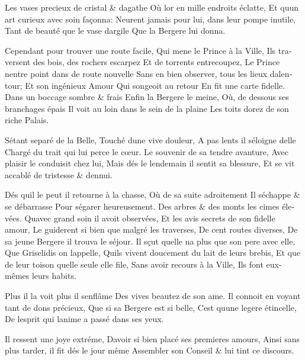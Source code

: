 \documentclass[14pt,a4paper]{memoir}
\begin{document}
\begin{otherlanguage}{french}
{Les vases precieux de cristal \& d\textquotesingle agathe} {Où
l\textquotesingle or en mille endroits éclatte,} {Et
qu\textquotesingle un art curieux avec soin façonna:}
{N\textquotesingle eurent jamais pour lui, dans leur pompe inutile,}
{Tant de beauté que le vase d\textquotesingle argile} {Que la Bergere
lui donna.}

{Cependant pour trouver une route facile,} {Qui mene le Prince à la
Ville,} {Ils traversent des bois, des rochers escarpez} {Et de torrents
entrecoupez,} {Le Prince n\textquotesingle entre point dans de route
nouvelle} {Sans en bien observer, tous les lieux
d\textquotesingle alentour; } {Et son ingénieux Amour} {Qui songeoit au
retour} {En fit une carte fidelle.} {Dans un boccage sombre \& frais}
{Enfin la Bergere le meine,} {Où, de dessous ses branchages épais} {Il
voit au loin dans le sein de la plaine} {Les toits dorez de son riche
Palais.}

{S\textquotesingle étant separé de la Belle,} {Touché
d\textquotesingle une vive douleur,} {A pas lents il
s\textquotesingle éloigne d\textquotesingle elle} {Chargé du trait qui
lui perce le cœur.} {Le souvenir de sa tendre avanture,} {Avec plaisir
le conduisit chez lui,} {Mais dés le lendemain il sentit sa blessure,}
{Et se vit accablé de tristesse \& d\textquotesingle ennui.}

{Dés qu\textquotesingle il le peut il retourne à la chasse,} {Où de sa
suite adroitement} {Il s\textquotesingle échappe \& se débarrasse} {Pour
s\textquotesingle égarer heureusement.} {Des arbres \& des monts les
cimes élevées.} {Qu\textquotesingle avec grand soin il avoit observées,}
{Et les avis secrets de son fidelle amour,} {Le guiderent si bien que
malgré les traverses,} {De cent routes diverses,} {De sa jeune Bergere
il trouva le séjour.} {Il sçut qu\textquotesingle elle
n\textquotesingle a plus que son pere avec elle, } {Que Griselidis on
l\textquotesingle appelle,} {Qu\textquotesingle ils vivent doucement du
lait de leurs brebis, } {Et que de leur toison qu\textquotesingle elle
seule elle file,} {Sans avoir recours à la Ville,} {Ils font eux-mêmes
leurs habits.}

{Plus il la voit plus il s\textquotesingle enflâme} {Des vives beautez
de son ame.} {Il connoit en voyant tant de dons précieux,} {Que si sa
Bergere est si belle,} {C\textquotesingle est qu\textquotesingle une
legere étincelle,} {De l\textquotesingle esprit qui
l\textquotesingle anime a passé dans ses yeux.}

{Il ressent une joye extréme,} {D\textquotesingle avoir si bien placé
ses premieres amours,} {Ainsi sans plus tarder, il fit dés le jour même
} {Assembler son Conseil \& lui tint ce discours. }


\end{otherlanguage}
\end{document}
